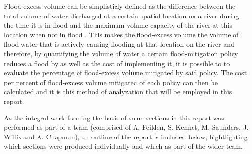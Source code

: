 \documentclass[11pt,a4paper]{article}
\begin{document}
Flood-excess volume can be simplisticly defined as the difference between the total volume of water discharged at a certain spatial location on a river during the time it is in flood and the maximum volume capacity of the river at this location when not in flood \cite{Aire}. This makes the flood-excess volume the volume of flood water that is actively causing flooding at that location on the river and therefore, by quantifying the volume of water a certain flood-mitigation policy reduces a flood by as well as the cost of implementing it, it is possible to to evaluate the percentage of flood-excess volume mitigated by said policy. The cost per percent of flood-excess volume mitigated of each policy can then be calculated and it is this method of analyzation that will be employed in this report.

As the integral work forming the basis of some sections in this report was performed as part of a team (comprised of A. Feilden, S. Kennet, M. Saunders, J. Willis and A. Chapman), an outline of the report is included below, hightlighting which sections were produced individually and which as part of the wider team.
\end{document}
